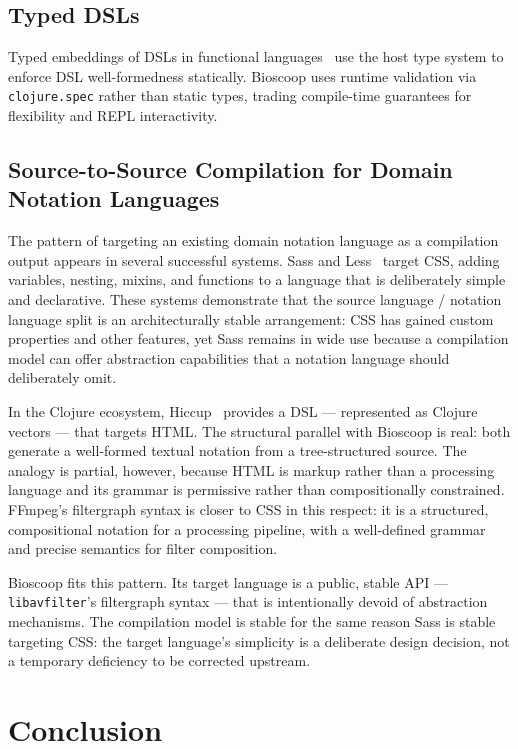 \documentclass[conference]{IEEEtran}
\begin{document}
\subsection{Typed DSLs}

Typed embeddings of DSLs in functional languages~\cite{carette} use the host type system to enforce DSL well-formedness statically. Bioscoop uses runtime validation via \texttt{clojure.spec} rather than static types, trading compile-time guarantees for flexibility and REPL interactivity.

\subsection{Source-to-Source Compilation for Domain Notation Languages}

The pattern of targeting an existing domain notation language as a compilation output appears in several successful systems. Sass and Less~\cite{sass} target CSS, adding variables, nesting, mixins, and functions to a language that is deliberately simple and declarative. These systems demonstrate that the source language / notation language split is an architecturally stable arrangement: CSS has gained custom properties and other features, yet Sass remains in wide use because a compilation model can offer abstraction capabilities that a notation language should deliberately omit.

In the Clojure ecosystem, Hiccup~\cite{hiccup} provides a DSL --- represented as Clojure vectors --- that targets HTML. The structural parallel with Bioscoop is real: both generate a well-formed textual notation from a tree-structured source. The analogy is partial, however, because HTML is markup rather than a processing language and its grammar is permissive rather than compositionally constrained. FFmpeg's filtergraph syntax is closer to CSS in this respect: it is a structured, compositional notation for a processing pipeline, with a well-defined grammar and precise semantics for filter composition.

Bioscoop fits this pattern. Its target language is a public, stable API --- \texttt{libavfilter}'s filtergraph syntax --- that is intentionally devoid of abstraction mechanisms. The compilation model is stable for the same reason Sass is stable targeting CSS: the target language's simplicity is a deliberate design decision, not a temporary deficiency to be corrected upstream.

\section{Conclusion}
\end{document}
